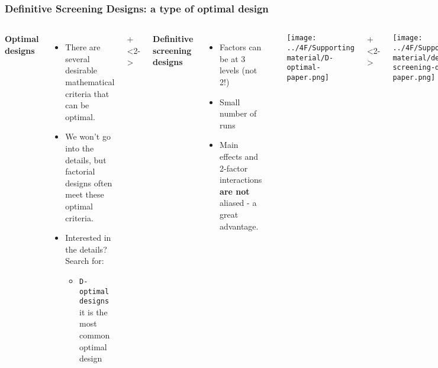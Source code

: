 \begin{frame}\frametitle{Definitive Screening Designs: a type of optimal design}
	\begin{columns}[T]
			\textbf{Optimal designs}
			
			\begin{itemize}
				\item	There are several desirable mathematical criteria that can be optimal.
				\item	We won't go into the details, but factorial designs often meet these optimal criteria.
				
				\item	Interested in the details? Search for:
					\begin{itemize}
						\item	\texttt{D-optimal designs}\\
							it is the most common optimal design
					\end{itemize}
			\end{itemize}
			
			\onslide+<2->{
			\textbf{Definitive screening designs}
				\begin{itemize}
					\item	Factors can be at 3 levels (not 2!)
					\item	Small number of runs
					\item	Main effects and 2-factor interactions \textbf{are not} aliased - a great advantage.
				\end{itemize}
			}
			\rule[3mm]{0.01cm}{90mm}
			
			\centerline{\texttt{[image: ../4F/Supporting material/D-optimal-paper.png]}}
		
			\onslide+<2->{
				\vspace{1cm}
				\centerline{\texttt{[image: ../4F/Supporting material/definitive-screening-design-paper.png]}}
			}
			
	\end{columns}	
\end{frame}

